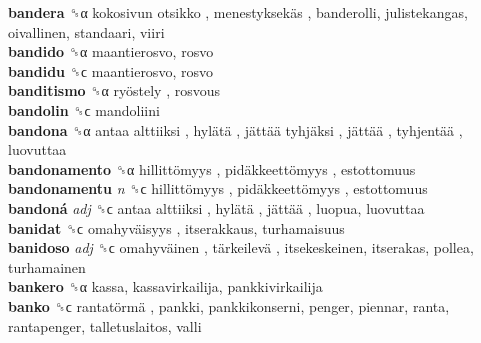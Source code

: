 \textbf{bandera} ␝α   kokosivun otsikko ,  menestyksekäs , banderolli, julistekangas, oivallinen, standaari, viiri  \\
\textbf{bandido} ␝α  maantierosvo, rosvo  \\
\textbf{bandidu} ␝ϲ  maantierosvo, rosvo  \\
\textbf{banditismo} ␝α   ryöstely , rosvous  \\
\textbf{bandolin} ␝ϲ  mandoliini  \\
\textbf{bandona} ␝α   antaa alttiiksi ,  hylätä ,  jättää tyhjäksi ,  jättää ,  tyhjentää , luovuttaa  \\
\textbf{bandonamento} ␝α   hillittömyys ,  pidäkkeettömyys , estottomuus  \\
\textbf{bandonamentu} \emph{n}  ␝ϲ   hillittömyys ,  pidäkkeettömyys , estottomuus  \\
\textbf{bandoná} \emph{adj}  ␝ϲ   antaa alttiiksi ,  hylätä ,  jättää , luopua, luovuttaa  \\
\textbf{banidat} ␝ϲ   omahyväisyys , itserakkaus, turhamaisuus  \\
\textbf{banidoso} \emph{adj}  ␝ϲ   omahyväinen ,  tärkeilevä , itsekeskeinen, itserakas, pollea, turhamainen  \\
\textbf{bankero} ␝α  kassa, kassavirkailija, pankkivirkailija  \\
\textbf{banko} ␝ϲ   rantatörmä , pankki, pankkikonserni, penger, piennar, ranta, rantapenger, talletuslaitos, valli  \\
